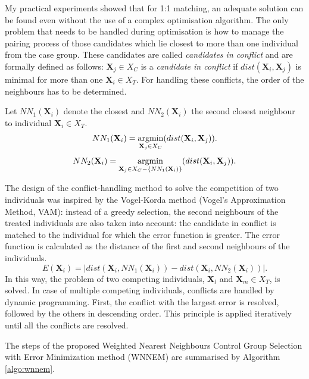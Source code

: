 		My practical experiments showed that for 1:1 matching, an adequate solution can be found even without the use of a complex optimisation algorithm. The only problem that needs to be handled during optimisation is how to manage the pairing process of those candidates which lie closest to more than one individual from the case group. These candidates are called \textit{candidates in conflict} and are formally defined as follows:
		$\textbf{X}_j \in X_C$ is a \textit{candidate in conflict} if $dist(\textbf{X}_i, \textbf{X}_j)$ is minimal for more than one $\textbf{X}_i \in X_T$. For handling these conflicts, the order of the neighbours has to be determined.
										
		Let $NN_1(\textbf{X}_i)$ denote the closest and $NN_2(\textbf{X}_i)$ the second closest neighbour to individual $\textbf{X}_i \in X_T$.				
		\begin{equation}
			\label{eq:nn1}
			NN_1(\textbf{X}_i)= \operatorname*{argmin}_{\textbf{X}_j \in X_C} (dist(\textbf{X}_i, \textbf{X}_j)).
		\end{equation}				
		\begin{equation}
			\label{eq:nn2}
			NN_2(\textbf{X}_i)= \operatorname*{argmin}_{\textbf{X}_j \in X_C - \{{NN_1}(\textbf{X}_i)\}} (dist(\textbf{X}_i, \textbf{X}_j)).
		\end{equation}
										
		The design of the conflict-handling method to solve the competition of two individuals was inspired by the Vogel-Korda method (Vogel's Approximation Method, VAM): instead of a greedy selection, the second neighbours of the treated individuals are also taken into account: the candidate in conflict is matched to the individual for which the error function is greater. The error function is calculated as the distance of the first and second neighbours of the individuals.				
		\begin{equation}
			\label{eq:err}
			E(\textbf{X}_i) = |dist(\textbf{X}_i, NN_1(\textbf{X}_i)) - dist(\textbf{X}_i, NN_2(\textbf{X}_i))|.
		\end{equation}				
		In this way, the problem of two competing individuals, $\textbf{X}_l$ and $\textbf{X}_m \in X_T$, is solved. In case of multiple competing individuals, conflicts are handled by dynamic programming. First, the conflict with the largest error is resolved, followed by the others in descending order. This principle is applied iteratively until all the conflicts are resolved. 
										
		The steps of the proposed Weighted Nearest Neighbours Control Group Selection with Error Minimization method (WNNEM) are summarised by Algorithm \ref{algo:wnnem}.
										
